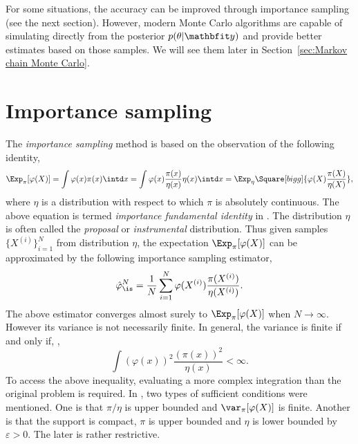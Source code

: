 For some situations, the accuracy can be improved through importance sampling
(see the next section). However, modern Monte Carlo algorithms are capable of
simulating directly from the posterior $p(\theta|\data)$ and provide better
estimates based on those samples. We will see them later in
Section~\ref{sec:Markov chain Monte Carlo}.

\section{Importance sampling}
\label{sec:Importance sampling}

The \emph{importance sampling} method is based on the observation of the
following identity,
\begin{equation}
  \Exp_{\pi}[\varphi(X)]
  = \int\varphi(x)\pi(x)\intd x
  = \int\varphi(x)\frac{\pi(x)}{\eta(x)}\eta(x)\intd x
  = \Exp_{\eta}\Square[bigg]{\varphi(X)\frac{\pi(X)}{\eta(X)}},
  \label{eq:impotance fundamental}
\end{equation}
where $\eta$ is a distribution with respect to which $\pi$ is absolutely
continuous. The above equation is termed \emph{importance fundamental
  identity} in \cite{Robert:2004tn}. The distribution $\eta$ is often called
the \emph{proposal} or \emph{instrumental} distribution. Thus given \iid
samples $\{X^{(i)}\}_{i=1}^N$ from distribution $\eta$, the expectation
$\Exp_{\pi}[\varphi(X)]$ can be approximated by the following importance
sampling estimator,
\begin{equation}
  \hat\varphi_{\is}^N
  = \frac{1}{N}\sum_{i=1}^N\varphi(X^{(i)})\frac{\pi(X^{(i)})}{\eta(X^{(i)})}.
  \label{eq:is normalized}
\end{equation}
The above estimator converges almost surely to $\Exp_{\pi}[\varphi(X)]$ when
$N\to\infty$. However its variance is not necessarily finite. In general, the
variance is finite if and only if, \cite[][sec.~3.3.2]{Robert:2004tn},
\begin{equation}
  \int(\varphi(x))^2\frac{(\pi(x))^2}{\eta(x)} < \infty.
\end{equation}
To access the above inequality, evaluating a more complex integration than the
original problem is required. In \cite{Geweke:1989tm}, two types of sufficient
conditions were mentioned. One is that $\pi/\eta$ is upper bounded and
$\var_{\pi}[\varphi(X)]$ is finite. Another is that the support is compact,
$\pi$ is upper bounded and $\eta$ is lower bounded by $\varepsilon > 0$. The
later is rather restrictive.


